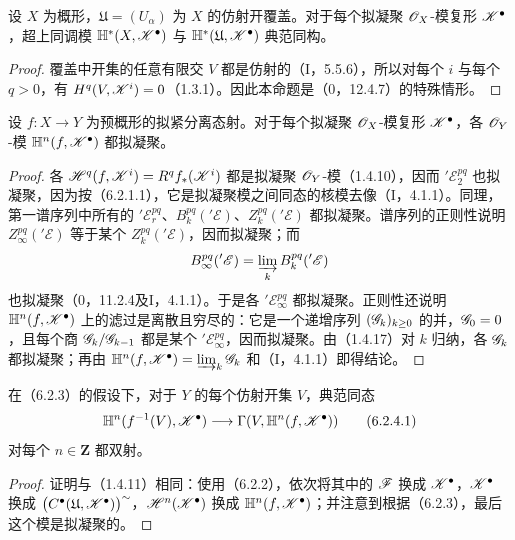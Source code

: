 设 $X$ 为概形，$\mathfrak U=(U_\alpha)$ 为 $X$ 的仿射开覆盖。对于每个拟凝聚 $\mathscr O_X$-模复形 $\mathscr K^\bullet$，超上同调模 $\mathbb H^*(X,\mathscr K^\bullet)$ 与 $\mathbb H^*(\mathfrak U,\mathscr K^\bullet)$ 典范同构。
\begin{proof}
覆盖中开集的任意有限交 $V$ 都是仿射的（I，5.5.6），所以对每个 $i$ 与每个 $q>0$，有 $H^q(V,\mathscr K^i)=0$（1.3.1）。因此本命题是（0，12.4.7）的特殊情形。
\end{proof}

设 $f:X\to Y$ 为预概形的拟紧分离态射。对于每个拟凝聚 $\mathscr O_X$-模复形 $\mathscr K^\bullet$，各 $\mathscr O_Y$-模 $\mathbb H^n(f,\mathscr K^\bullet)$ 都拟凝聚。
\begin{proof}
各 $\mathscr H^q(f,\mathscr K^i)=R^qf_*(\mathscr K^i)$ 都是拟凝聚 $\mathscr O_Y$-模（1.4.10），因而 ${}'\mathscr E_2^{pq}$ 也拟凝聚，因为按（6.2.1.1），它是拟凝聚模之间同态的核模去像（I，4.1.1）。同理，第一谱序列中所有的 ${}'\mathscr E_r^{pq}$、$B_k^{pq}({}'\mathscr E)$、$Z_k^{pq}({}'\mathscr E)$ 都拟凝聚。谱序列的正则性说明 $Z_\infty^{pq}({}'\mathscr E)$ 等于某个 $Z_k^{pq}({}'\mathscr E)$，因而拟凝聚；而
\[
 B_\infty^{pq}({}'\mathscr E)=\varinjlim_k B_k^{pq}({}'\mathscr E)
\]
也拟凝聚（0，11.2.4及I，4.1.1）。于是各 ${}'\mathscr E_\infty^{pq}$ 都拟凝聚。正则性还说明 $\mathbb H^n(f,\mathscr K^\bullet)$ 上的滤过是离散且穷尽的：它是一个递增序列 $(\mathscr G_k)_{k\geq0}$ 的并，$\mathscr G_0=0$，且每个商 $\mathscr G_k/\mathscr G_{k-1}$ 都是某个 ${}'\mathscr E_\infty^{pq}$，因而拟凝聚。由（1.4.17）对 $k$ 归纳，各 $\mathscr G_k$ 都拟凝聚；再由
$\mathbb H^n(f,\mathscr K^\bullet)=\varinjlim_k\mathscr G_k$ 和（I，4.1.1）即得结论。
\end{proof}

在（6.2.3）的假设下，对于 $Y$ 的每个仿射开集 $V$，典范同态
\begin{equation}
 \mathbb H^n(f^{-1}(V),\mathscr K^\bullet)
 \longrightarrow\Gamma(V,\mathbb H^n(f,\mathscr K^\bullet))\tag{6.2.4.1}
\end{equation}
对每个 $n\in\mathbf Z$ 都双射。
\begin{proof}
证明与（1.4.11）相同：使用（6.2.2），依次将其中的 $\mathscr F$ 换成 $\mathscr K^\bullet$，$\mathscr K^\bullet$ 换成 $\bigl(C^\bullet(\mathfrak U,\mathscr K^\bullet)\bigr)^\sim$，$\mathscr H^n(\mathscr K^\bullet)$ 换成 $\mathbb H^n(f,\mathscr K^\bullet)$；并注意到根据（6.2.3），最后这个模是拟凝聚的。
\end{proof}

